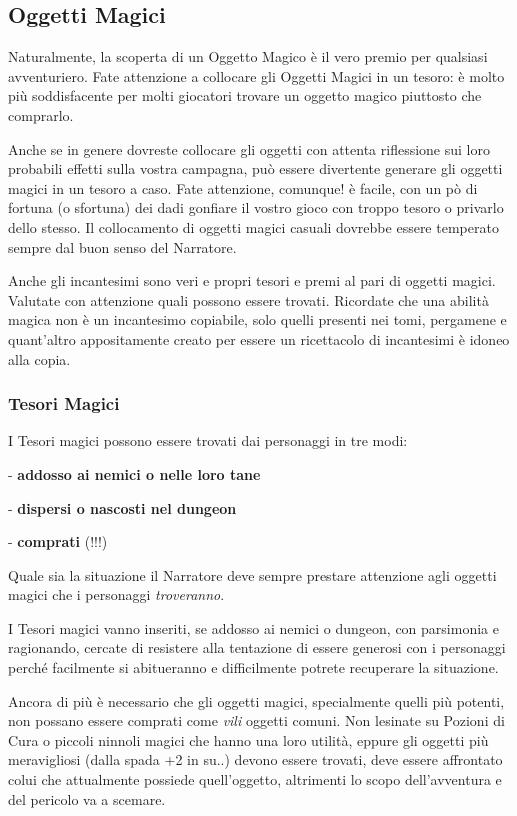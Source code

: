 \begin{multicols}{2}
\subsection{Oggetti Magici}

Naturalmente, la scoperta di un Oggetto Magico è il vero premio per qualsiasi avventuriero. Fate attenzione a collocare gli Oggetti Magici in un tesoro: è molto più soddisfacente per molti giocatori trovare un oggetto magico piuttosto che comprarlo.

Anche se in genere dovreste collocare gli oggetti con attenta riflessione sui loro probabili effetti sulla vostra campagna, può essere divertente generare gli oggetti magici in un tesoro a caso. Fate attenzione, comunque! è facile, con un pò di fortuna (o sfortuna) dei dadi gonfiare il vostro gioco con troppo tesoro o privarlo dello stesso. Il collocamento di oggetti magici casuali dovrebbe essere temperato sempre dal buon senso del Narratore.

Anche gli incantesimi sono veri e propri tesori e premi al pari di oggetti magici. Valutate con attenzione quali possono essere trovati. Ricordate che una abilità magica non è un incantesimo copiabile, solo quelli presenti nei tomi, pergamene e quant'altro appositamente creato per essere un ricettacolo di incantesimi è idoneo alla copia.

\subsubsection{Tesori Magici}\label{tesorimagici}

I Tesori magici possono essere trovati dai personaggi in tre modi:

\medskip

- \textbf{addosso ai nemici o nelle loro tane}

- \textbf{dispersi o nascosti nel dungeon}

- \textbf{comprati} (!!!)

\medskip

Quale sia la situazione il Narratore deve sempre prestare attenzione agli oggetti magici che i personaggi \emph{troveranno}.

I Tesori magici vanno inseriti, se addosso ai nemici o dungeon, con parsimonia e ragionando, cercate di resistere alla tentazione di essere generosi con i personaggi perché facilmente si abitueranno e difficilmente potrete recuperare la situazione.

Ancora di più è necessario che gli oggetti magici, specialmente quelli più potenti, non possano essere comprati come \emph{vili} oggetti comuni. Non lesinate su Pozioni di Cura o piccoli ninnoli magici che hanno una loro utilità, eppure gli oggetti più meravigliosi (dalla spada +2 in su..) devono essere trovati, deve essere affrontato colui che attualmente possiede quell'oggetto, altrimenti lo scopo dell'avventura e del pericolo va a scemare.


\end{multicols}
